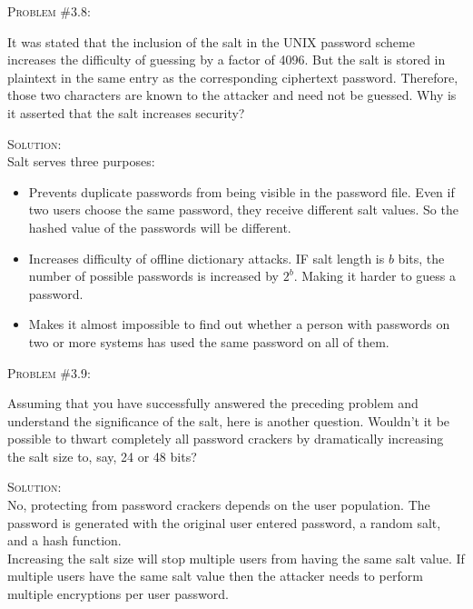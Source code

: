 \documentclass[12pt]{article}
\newenvironment{problem}[1]
{\begin{mdframed}[linewidth=0.8pt]
        \textsc{Problem #1:}

}
    {\end{mdframed}}
\newenvironment{solution}
    {\textsc{Solution:}\\}
    {\newpage}%
\begin{document}
	\begin{problem}{\#3.8}
		It was stated that the inclusion of the salt in the UNIX password scheme
		increases the difficulty of guessing by a factor of 4096. But the salt is
		stored in plaintext in the same entry as the corresponding ciphertext
		password. Therefore, those two characters are known to the attacker and
		need not be guessed. Why is it asserted that the salt increases security? 
	\end{problem}
	\begin{solution}
		Salt serves three purposes:
		\begin{itemize}
			\item Prevents duplicate passwords from being visible in the password
				file. Even if two users choose the same password, they receive
				different salt values. So the hashed value of the passwords
				will be different.
			\item Increases difficulty of offline dictionary attacks. IF salt
				length is $b$ bits, the number of possible passwords is increased
				by $2^b$. Making it harder to guess a password.
			\item Makes it almost impossible to find out whether a person with passwords
				on two or more systems has used the same password on all of them.
		\end{itemize}
	\end{solution}


	\begin{problem}{\#3.9}
		Assuming that you have successfully answered the preceding problem and
		understand the significance of the salt, here is another question.
		Wouldn't it be possible to thwart completely all password crackers by
		dramatically increasing the salt size to, say, 24 or 48 bits?
	\end{problem}
	\begin{solution}
		No, protecting from password crackers depends on the user population.
		The password is generated with the original user entered password, a random
		salt, and a hash function.\\
		Increasing the salt size will stop multiple users from having the same
		salt value. If multiple users have the same salt value then the attacker
		needs to perform multiple encryptions per user password.
	\end{solution}
\end{document}
